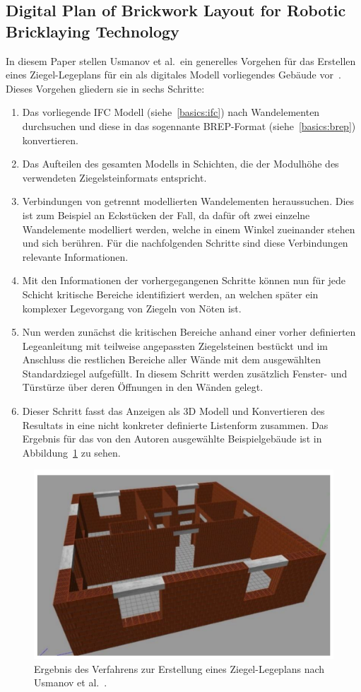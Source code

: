 \subsection{Digital Plan of Brickwork Layout for Robotic Bricklaying Technology}\label{related:digital_plan_of_brickwork_layout}
In diesem Paper stellen Usmanov et al.\ ein generelles Vorgehen für das Erstellen eines Ziegel-Legeplans für ein als digitales Modell vorliegendes Gebäude vor~\cite{Usmanov2021}.
Dieses Vorgehen gliedern sie in sechs Schritte:
\begin{enumerate}
\item Das vorliegende IFC Modell (siehe~\ref{basics:ifc}) nach Wandelementen durchsuchen und diese in das sogennante BREP-Format (siehe~\ref{basics:brep}) konvertieren.
\item Das Aufteilen des gesamten Modells in Schichten, die der Modulhöhe des verwendeten Ziegelsteinformats entspricht.
\item Verbindungen von getrennt modellierten Wandelementen heraussuchen. 
Dies ist zum Beispiel an Eckstücken der Fall, da dafür oft zwei einzelne Wandelemente modelliert werden, welche in einem Winkel zueinander stehen und sich berühren. 
Für die nachfolgenden Schritte sind diese Verbindungen relevante Informationen.
\item Mit den Informationen der vorhergegangenen Schritte können nun für jede Schicht kritische Bereiche identifiziert werden, an welchen später ein komplexer Legevorgang von Ziegeln von Nöten ist.
\item Nun werden zunächst die kritischen Bereiche anhand einer vorher definierten Legeanleitung mit teilweise angepassten Ziegelsteinen bestückt und im Anschluss die restlichen Bereiche aller Wände mit dem ausgewählten Standardziegel aufgefüllt. 
In diesem Schritt werden zusätzlich Fenster- und Türstürze über deren Öffnungen in den Wänden gelegt.
\item Dieser Schritt fasst das Anzeigen als 3D Modell und Konvertieren des Resultats in eine nicht konkreter definierte Listenform zusammen. 
Das Ergebnis für das von den Autoren ausgewählte Beispielgebäude ist in Abbildung~\ref{fig:related:usmanov} zu sehen. 
\end{enumerate}

\begin{figure}[h!]
    \centering
    \includegraphics[width=0.7\columnwidth]{fig/sustainability1303905g004.png}
    \caption{Ergebnis des Verfahrens zur Erstellung eines Ziegel-Legeplans nach Usmanov et al.~\cite{Usmanov2021}.}\label{fig:related:usmanov}
\end{figure}

